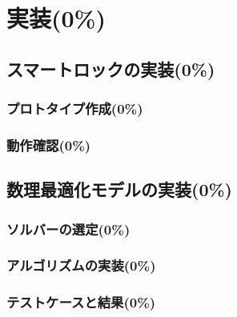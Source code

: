 \section{実装(0\%)}
  \label{sec:実装}
    \par
  
  \subsection{スマートロックの実装(0\%)}
    \label{sec:スマートロックの実装}
      \par
  
      \subsubsection{プロトタイプ作成(0\%)}
        \label{sec:プロトタイプ作成}
          \par
          
      \subsubsection{動作確認(0\%)}
        \label{sec:動作確認}
          \par
          
  \subsection{数理最適化モデルの実装(0\%)}
    \label{sec:数理最適化モデルの実装}
      \par
      
      \subsubsection{ソルバーの選定(0\%)}
        \label{sec:ソルバーの選定}
          \par
          
      \subsubsection{アルゴリズムの実装(0\%)}
        \label{sec:アルゴリズムの実装}
          \par
          
      \subsubsection{テストケースと結果(0\%)}
        \label{sec:テストケースと結果}
          \par  
  
